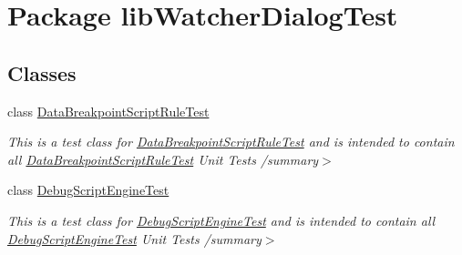 \hypertarget{namespacelib_watcher_dialog_test}{\section{Package lib\+Watcher\+Dialog\+Test}
\label{namespacelib_watcher_dialog_test}
}
\subsection*{Classes}
\begin{DoxyCompactItemize}
\item 
class \hyperlink{classlib_watcher_dialog_test_1_1_data_breakpoint_script_rule_test}{Data\+Breakpoint\+Script\+Rule\+Test}
\begin{DoxyCompactList}\small\item\em This is a test class for \hyperlink{classlib_watcher_dialog_test_1_1_data_breakpoint_script_rule_test}{Data\+Breakpoint\+Script\+Rule\+Test} and is intended to contain all \hyperlink{classlib_watcher_dialog_test_1_1_data_breakpoint_script_rule_test}{Data\+Breakpoint\+Script\+Rule\+Test} Unit Tests /summary$>$ \end{DoxyCompactList}\item 
class \hyperlink{classlib_watcher_dialog_test_1_1_debug_script_engine_test}{Debug\+Script\+Engine\+Test}
\begin{DoxyCompactList}\small\item\em This is a test class for \hyperlink{classlib_watcher_dialog_test_1_1_debug_script_engine_test}{Debug\+Script\+Engine\+Test} and is intended to contain all \hyperlink{classlib_watcher_dialog_test_1_1_debug_script_engine_test}{Debug\+Script\+Engine\+Test} Unit Tests /summary$>$ \end{DoxyCompactList}\end{DoxyCompactItemize}
